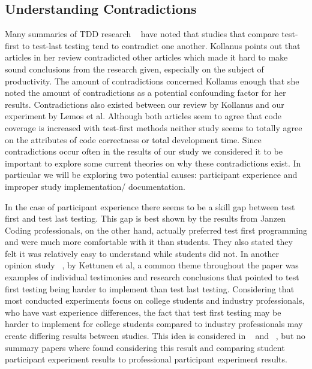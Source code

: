 \documentclass{sig-alternate}
\begin{document}
\subsection{Understanding Contradictions}
Many summaries of TDD research ~\cite{Hammond:2012, Hellman:2012, Kettunen:2010, Kollanus:2010} have noted that studies that compare test-first to test-last testing tend to contradict one another.  Kollanus points out that articles in her review contradicted other articles which made it hard to make sound conclusions from the research given, especially on the subject of productivity.  The amount of contradictions concerned Kollanus enough that she noted the amount of contradictions as a potential confounding factor for her results.  Contradictions also existed between our review by Kollanus and our experiment by Lemos et al.  Although both articles seem to agree that code coverage is increased with test-first methods neither study seems to totally agree on the attributes of code correctness or total development time.  Since contradictions occur often in the results of our study we considered it to be important to explore some current theories on why these contradictions exist.  In particular we will be exploring two potential causes: participant experience and improper study implementation/ documentation.

In the case of participant experience there seems to be a skill gap between test first and test last testing.  This gap is best shown by the results from Janzen  Coding professionals, on the other hand, actually preferred test first programming and were much more comfortable with it than students.  They also stated they felt it was relatively easy to understand while students did not. In another opinion study ~\cite{Kettunen:2010}, by Kettunen et al, a common theme throughout the paper was examples of individual testimonies and research conclusions that pointed to test first testing being harder to implement than test last testing.   Considering that most conducted experiments focus on college students and industry professionals, who have vast experience differences, the fact that test first testing may be harder to implement for college students compared to industry professionals may create differing results between studies.   This idea is considered in ~\cite{Hammond:2012} and ~\cite{Kettunen:2010}, but no summary papers where found considering this result and comparing student participant experiment results to professional participant experiment results.
\end{document}
